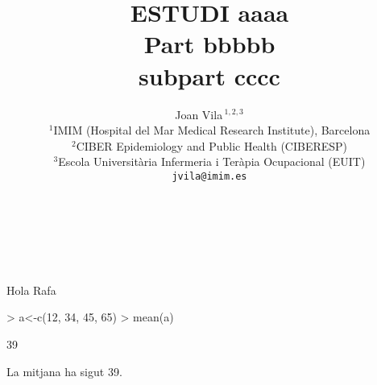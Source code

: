 \documentclass[a4paper,titlepage,12pt]{article}
\title{\bf ESTUDI aaaa\\
Part bbbbb\\
subpart cccc}
\author{Joan Vila\,$^{1,2,3}$\\
\scriptsize $^{1}$IMIM (Hospital del Mar Medical Research Institute), Barcelona\\
\scriptsize $^{2}$CIBER Epidemiology and Public Health (CIBERESP)\\
\scriptsize $^{3}$Escola Universitària Infermeria i Teràpia Ocupacional (EUIT)\\
\vspace{1cm}
\texttt{jvila@imim.es}
}
\begin{document}
\maketitle

\vspace{2.5cm}

\newpage
\tableofcontents
\
\\
\listoftables
\
\\
\listoffigures

\newpage
Hola Rafa
\begin{Schunk}
\begin{Sinput}
> a<-c(12, 34, 45, 65)
> mean(a)
\end{Sinput}
\begin{Soutput}
[1] 39
\end{Soutput}
\end{Schunk}

La mitjana ha sigut 39.

\end{document}
